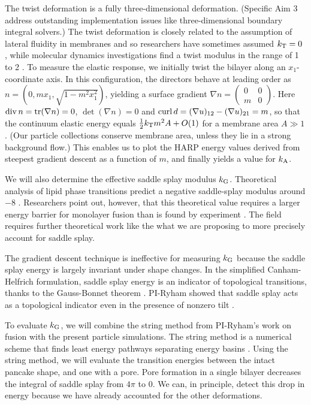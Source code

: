 The twist deformation is a fully three-dimensional deformation. 
(Specific Aim 3 address outstanding implementation issues like three-dimensional boundary integral solvers.) 
The twist deformation is closely related to the assumption of lateral fluidity in membranes and so researchers 
have sometimes assumed $k_{\mathrm{T}} = 0$ \cite{Hamm2000, TerziDeserno17, C9SM02079A, PhysRevE.102.042406}, 
while molecular dynamics investigations find a twist modulus in the range of 1 to 2 
\kBT \cite{LeVeWa14}.
To measure the elastic response,  we initially twist the bilayer along an $x_1$-coordinate axis.
In this configuration, the directors behave at leading order as $n = (0, mx_1, \sqrt{1 - m^2x_1^2})$,
yielding a surface gradient $\nabla n = \begin{pmatrix}0 & 0\\ m & 0\end{pmatrix}$. 
Here $\operatorname{div} n = \mathrm{tr}(\nabla n) = 0$, $\det(\nabla n) = 0$ and $\operatorname{curl} d = (\nabla u)_{12} - (\nabla u)_{21} = m$,
so that the continuum elastic energy equals $\tfrac{1}{2}k_{\mathrm{T}} m^2 A + O(1)$ for a membrane area $A \gg 1$. (Our particle collections
conserve membrane area, unless they lie in a strong background flow.) 
This enables us to plot the HARP energy values derived from steepest gradient descent as a function of $m$, and finally
yields a value for $k_{\mathrm{A}}$. 

We will also determine the effective saddle splay modulus $k_{\mathrm{G}}$. 
Theoretical analysis of lipid phase transitions predict a negative saddle-splay modulus around $-8$ \kBT\;
\cite{SIEGEL2004366,SIEGEL20085200}. Researchers point out, however, that this theoretical value requires a larger energy 
barrier for monolayer fusion than is found by experiment \cite{FrRoPi17,Tran7106,TerziDeserno17}. 
The field requires further theoretical work like the what we are proposing to more precisely account for saddle splay.
  
The gradient descent technique is ineffective for measuring $k_{\mathrm{G}}$ because
the saddle splay energy is largely invariant under shape changes.
In the simplified Canham-Helfrich formulation, saddle splay energy is an indicator of topological transitions, thanks to the  Gauss-Bonnet theorem
\cite{TerziDeserno17}.
PI-Ryham showed that saddle splay acts as a topological indicator even in the presence of nonzero tilt \cite{RyKlYaCo16}. 

To evaluate $k_{\mathrm{G}}$, we will combine the string method from PI-Ryham's work on fusion \cite{RyKlYaCo16} with
the present particle simulations. The string method is a numerical scheme that finds
least energy pathways separating energy basins \cite{doi:10.1063/1.2720838}.
Using the string method, we will evaluate the transition energies between the intact pancake shape,
and one with a pore. Pore formation in a single bilayer decreases the integral of saddle splay from $4\pi$
to $0$. We can, in principle, detect this drop in energy because we have already accounted for the other deformations. 

